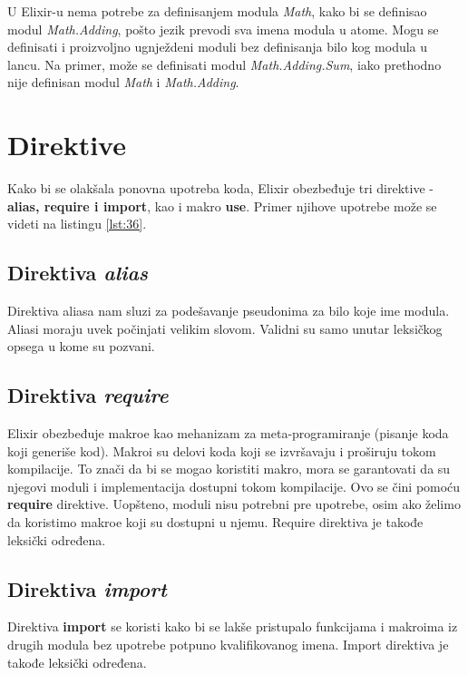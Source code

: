 \documentclass[12pt,oneside]{memoir}
\begin{document}


\noindent U Elixir-u nema potrebe za definisanjem modula \textit{Math}, kako bi se definisao modul \textit{Math.Adding}, pošto jezik prevodi sva imena modula u atome. Mogu se  definisati i proizvoljno ugnježdeni moduli bez definisanja bilo kog modula u lancu. Na primer, može se definisati modul \textit{Math.Adding.Sum}, iako  prethodno nije definisan modul \textit{Math} i \textit{Math.Adding}.

\section{Direktive}

Kako bi se olakšala ponovna upotreba koda, Elixir obezbeđuje tri direktive - \textbf{alias, require i import}, kao i makro \textbf{use}. Primer njihove upotrebe može se videti na listingu \ref{lst:36}.



\subsection{Direktiva \textit{alias}}
Direktiva aliasa nam sluzi za podešavanje pseudonima za bilo koje ime modula. Aliasi moraju uvek počinjati velikim slovom. Validni su samo unutar leksičkog opsega u kome su pozvani.

\subsection{Direktiva \textit{require}}
Elixir obezbeđuje makroe kao mehanizam za meta-programiranje (pisanje koda koji generiše kod). Makroi su delovi koda koji se izvršavaju i proširuju tokom kompilacije. To znači da bi se mogao koristiti makro, mora se garantovati da su njegovi moduli i implementacija dostupni tokom kompilacije. Ovo se čini pomoću \textbf{require} direktive. Uopšteno, moduli nisu potrebni pre upotrebe, osim ako želimo da koristimo makroe koji su dostupni u njemu. Require direktiva je takođe leksički određena.

\subsection{Direktiva \textit{import}}
Direktiva \textbf{import} se koristi kako bi se lakše pristupalo funkcijama i makroima iz drugih modula bez upotrebe potpuno kvalifikovanog imena. Import direktiva je takođe leksički određena. 
\end{document}
